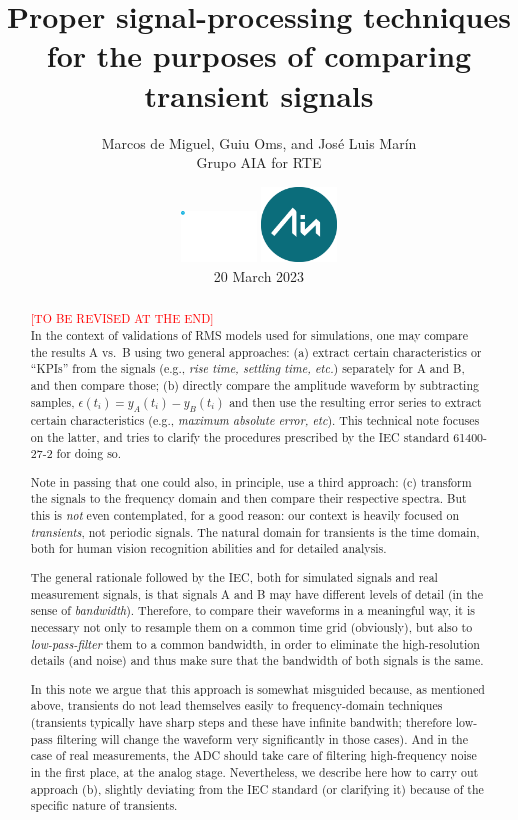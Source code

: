 \documentclass[11pt, a4paper, twoside, titlepage]{article}
\title{Proper signal-processing techniques for the purposes of
  comparing transient signals}
\author{Marcos de Miguel, Guiu Oms, and José Luis Marín \\
        Grupo AIA for RTE}
\date{
  \vspace{2cm}
  \includegraphics[width=2cm]{logos/Logo_RTE.pdf}
  \includegraphics[width=2cm]{logos/Logo-pequeno.png}\\
  \vspace{1cm}
  20 March 2023
}
\begin{document}
\hypersetup{pageanchor=false}
\begin{titlepage}
  \maketitle
\end{titlepage}
\hypersetup{pageanchor=true}

\begin{abstract}
  \textcolor{red}{[TO BE REVISED AT THE END]}\\
  In the context of validations of RMS models used for simulations,
  one may compare the results A vs.\ B using two general approaches:
  (a) extract certain characteristics or ``KPIs'' from the signals
  (e.g., \emph{rise time, settling time, etc.}) separately for A and
  B, and then compare those; (b) directly compare the amplitude
  waveform by subtracting samples, $\epsilon(t_i)=y_A(t_i)-y_B(t_i)$
  and then use the resulting error series to extract certain
  characteristics (e.g., \emph{maximum absolute error, etc}). This
  technical note focuses on the latter, and tries to clarify the
  procedures prescribed by the IEC standard 61400-27-2 for doing so.

  Note in passing that one could also, in principle, use a third
  approach: (c) transform the signals to the frequency domain and then
  compare their respective spectra. But this is \emph{not} even
  contemplated, for a good reason: our context is heavily focused on
  \emph{transients}, not periodic signals. The natural domain for
  transients is the time domain, both for human vision recognition
  abilities and for detailed analysis.

  The general rationale followed by the IEC, both for simulated
  signals and real measurement signals, is that signals A and B may
  have different levels of detail (in the sense of
  \emph{bandwidth}). Therefore, to compare their waveforms in a
  meaningful way, it is necessary not only to resample them on a
  common time grid (obviously), but also to \emph{low-pass-filter} them to a
  common bandwidth, in order to eliminate the high-resolution details
  (and noise) and thus make sure that the bandwidth of both signals is
  the same.

  In this note we argue that this approach is somewhat misguided
  because, as mentioned above, transients do not lead themselves
  easily to frequency-domain techniques (transients typically have
  sharp steps and these have infinite bandwith; therefore low-pass
  filtering will change the waveform very significantly in those
  cases). And in the case of real measurements, the ADC should take
  care of filtering high-frequency noise in the first place, at the
  analog stage.  Nevertheless, we describe here how to carry out
  approach (b), slightly deviating from the IEC standard (or
  clarifying it) because of the specific nature of transients.


\end{abstract}
\end{document}
